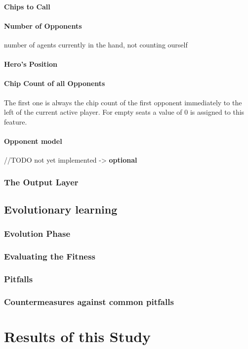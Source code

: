 \subsubsection{Chips to Call}
\subsubsection{Number of Opponents}
number of agents currently in the hand, not counting ourself
\subsubsection{Hero's Position}
\subsubsection{Chip Count of all Opponents}
The first one is always the chip count of the first opponent immediately to the left of the current active player.
For empty seats a value of 0 is assigned to this feature.
\subsubsection{Opponent model}
//TODO not yet implemented -> \textbf{optional}
\subsection{The Output Layer}
\section{Evolutionary learning}
\subsection{Evolution Phase}
\subsection{Evaluating the Fitness}
\subsection{Pitfalls}
\subsection{Countermeasures against common pitfalls}

\chapter{Results of this Study}

